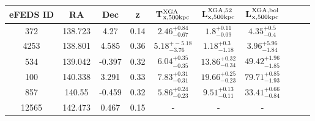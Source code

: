 \documentclass[fleqn,usenatbib]{mnras}
\begin{document}
\begin{table}
\begin{center}
\contcaption{{}}
\vspace{1mm}
\begin{tabular}{cccccccccc}
\hline
\hline
eFEDS ID & RA & Dec & z & T$^{\rm{XGA}}_{\rm{x}, 500kpc}$ & L$^{\rm{XGA, 52}}_{\rm{x, 500kpc}}$ & L$^{\rm{XGA, bol}}_{\rm{x, 500kpc}}$\\
\hline
\hline
372 & 138.723 & 4.27 & 0.14 & $2.46^{+0.84}_{-0.67}$ & $1.8^{+0.11}_{-0.09}$ & $4.35^{+0.5}_{-0.4}$ \\ 
\hline
4253 & 138.801 & 4.585 & 0.36 & $5.18^{+-5.18}_{-3.76}$ & $1.18^{+0.3}_{-1.18}$ & $3.96^{+5.96}_{-1.84}$ \\ 
\hline
534 & 139.042 & -0.397 & 0.32 & $6.04^{+0.35}_{-0.35}$ & $13.86^{+0.32}_{-0.34}$ & $49.42^{+1.96}_{-1.85}$ \\ 
\hline
100 & 140.338 & 3.291 & 0.33 & $7.83^{+0.31}_{-0.31}$ & $19.66^{+0.25}_{-0.23}$ & $79.71^{+0.85}_{-1.93}$ \\ 
\hline
857 & 140.55 & -0.459 & 0.32 & $5.86^{+0.24}_{-0.23}$ & $9.51^{+0.13}_{-0.11}$ & $33.41^{+0.66}_{-0.84}$ \\ 
\hline
12565 & 142.473 & 0.467 & 0.15 & - & - & - \\ 
\hline
\end{tabular}
\end{center}
\end{table}





\bsp	%
\label{lastpage}
\end{document}
